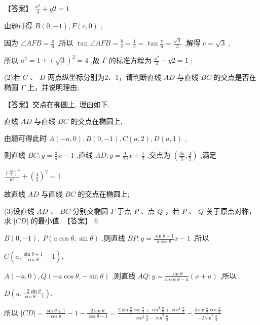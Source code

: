 \documentclass[10pt]{article}
\begin{document}
【答案】 \(\frac{{x}^{2}}{4} + {y2} = 1\)

由题可得 \(B\left( {0, - 1}\right) ,F\left( {c,0}\right)\) ,

因为 \(\angle {AFB} = \frac{\pi }{6}\) ,所以 \(\tan \angle {AFB} = \frac{b}{c} = \frac{1}{c} = \tan \frac{\pi }{6} = \frac{\sqrt{3}}{3}\) ,解得 \(c = \sqrt{3}\) ,

所以 \({a}^{2} = 1 + {\left( \sqrt{3}\right) }^{2} = 4\) ,故 \(\Gamma\) 的标准方程为 \(\frac{{x}^{2}}{4} + {y2} = 1\) ;

(2)若 \(C\) 、 \(D\) 两点纵坐标分别为2、1，请判断直线 \({AD}\) 与直线 \({BC}\) 的交点是否在椭圆 \(\Gamma\) 上，并说明理由;

【答案】交点在椭圆上, 理由如下.

直线 \({AD}\) 与直线 \({BC}\) 的交点在椭圆上,

由题可得此时 \(A\left( {-a,0}\right) ,B\left( {0, - 1}\right) ,C\left( {a,2}\right) ,D\left( {a,1}\right)\) ,

则直线 \({BC} : y = \frac{3}{a}x - 1\) ,直线 \({AD} : y = \frac{1}{2a}x + \frac{1}{2}\) ,交点为 \(\left( {\frac{3a}{5},\frac{4}{5}}\right)\) ,满足

\(\frac{{\left( \frac{3a}{5}\right) }^{2}}{{a}^{2}} + {\left( \frac{4}{5}\right) }^{2} = 1\)

故直线 \({AD}\) 与直线 \({BC}\) 的交点在椭圆上;

(3)设直线 \({AD}\) 、 \({BC}\) 分别交椭圆 \(\Gamma\) 于点 \(P\) 、点 \(Q\) ，若 \(P\) 、 \(Q\) 关于原点对称，求 \(\left| {CD}\right|\) 的最小值. 【答案】 6

\(B\left( {0, - 1}\right) ,\;P\left( {a\cos \theta ,\sin \theta }\right)\) ,则直线 \({BP} : y = \frac{\sin \theta  + 1}{a\cos \theta }x - 1\) ,所以

\(C\left( {a,\frac{\sin \theta  + 1}{\cos \theta } - 1}\right) ,\)

\(A\left( {-a,0}\right) ,Q\left( {-a\cos \theta , - \sin \theta }\right)\) ,则直线 \({AQ} : y = \frac{\sin \theta }{a\cos \theta  - a}\left( {x + a}\right)\) ,所以

\(D\left( {a,\frac{2\sin \theta }{\cos \theta  - 1}}\right) ,\)

所以 \(\left| {CD}\right|  = \frac{\sin \theta  + 1}{\cos \theta } - 1 - \frac{2\sin \theta }{\cos \theta  - 1} = \frac{2\sin \frac{\theta }{2}\cos \frac{\theta }{2} + {\sin }^{2}\frac{\theta }{2} + {\cos }^{2}\frac{\theta }{2}}{{\cos }^{2}\frac{\theta }{2} - {\sin }^{2}\frac{\theta }{2}} - \frac{4\sin \frac{\theta }{2}\cos \frac{\theta }{2}}{-2{\sin }^{2}\frac{\theta }{2}}\)
\end{document}
